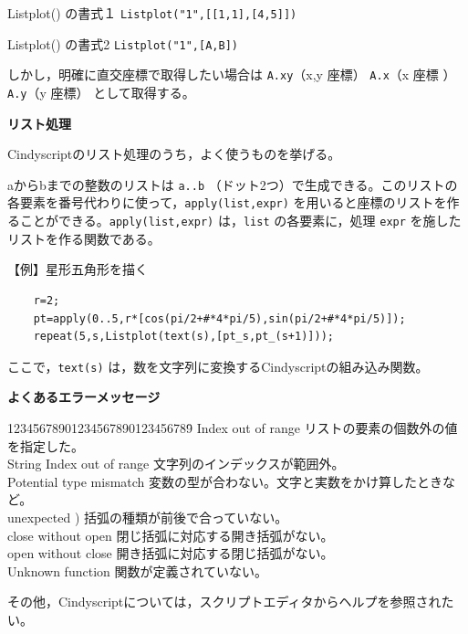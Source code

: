 \documentclass[papersize,a4paper,12pt,uplatex]{jsarticle}
\begin{document}
\vspace{\baselineskip}
Listplot() の書式１  \verb|Listplot("1",[[1,1],[4,5]])|

Listplot() の書式2  \verb|Listplot("1",[A,B])|

\vspace{\baselineskip}

しかし，明確に直交座標で取得したい場合は  \verb|A.xy|（x,y 座標）  \verb|A.x|（x 座標 ）   \verb|A.y|（y 座標）  として取得する。

\vspace{\baselineskip}
{\bf リスト処理}

Cindyscriptのリスト処理のうち，よく使うものを挙げる。

aからbまでの整数のリストは \verb|a..b| （ドット2つ）で生成できる。このリストの各要素を番号代わりに使って，\verb|apply(list,expr)| を用いると座標のリストを作ることができる。\verb|apply(list,expr)| は，\verb|list| の各要素に，処理 \verb|expr| を施したリストを作る関数である。

\vspace{\baselineskip}
【例】星形五角形を描く
\begin{verbatim}
    r=2;
    pt=apply(0..5,r*[cos(pi/2+#*4*pi/5),sin(pi/2+#*4*pi/5)]);
    repeat(5,s,Listplot(text(s),[pt_s,pt_(s+1)]));
\end{verbatim}

ここで，\verb|text(s)| は，数を文字列に変換するCindyscriptの組み込み関数。

\vspace{\baselineskip}
{\bf よくあるエラーメッセージ}
\begin{tabbing}
1234\=5678901234567890123456789\=\kill
 \>Index out of range \>リストの要素の個数外の値を指定した。\\
 \>String Index out of range \>文字列のインデックスが範囲外。\\
 \>Potential type mismatch \>変数の型が合わない。文字と実数をかけ算したときなど。\\
 \>unexpected ) \>括弧の種類が前後で合っていない。\\
 \>close  without open \>閉じ括弧に対応する開き括弧がない。\\
 \>open  without close \>開き括弧に対応する閉じ括弧がない。\\
 \>Unknown function \>関数が定義されていない。
\end{tabbing}


\vspace{\baselineskip}
その他，Cindyscriptについては，スクリプトエディタからヘルプを参照されたい。
\end{document}
